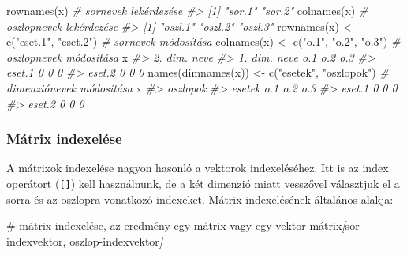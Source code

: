 \documentclass[
]{book}
\newenvironment{Shaded}{\begin{snugshade}}{\end{snugshade}}
\newcommand{\CommentTok}[1]{\textcolor[rgb]{0.56,0.35,0.01}{\textit{#1}}}
\newcommand{\FunctionTok}[1]{\textcolor[rgb]{0.00,0.00,0.00}{#1}}
\newcommand{\NormalTok}[1]{#1}
\newcommand{\OtherTok}[1]{\textcolor[rgb]{0.56,0.35,0.01}{#1}}
\newcommand{\StringTok}[1]{\textcolor[rgb]{0.31,0.60,0.02}{#1}}
\begin{document}
\begin{Shaded}
\begin{Highlighting}[]
\FunctionTok{rownames}\NormalTok{(x)                           }\CommentTok{\# sornevek lekérdezése}
\CommentTok{\#\textgreater{} [1] "sor.1" "sor.2"}
\FunctionTok{colnames}\NormalTok{(x)                           }\CommentTok{\# oszlopnevek lekérdezése}
\CommentTok{\#\textgreater{} [1] "oszl.1" "oszl.2" "oszl.3"}
\FunctionTok{rownames}\NormalTok{(x) }\OtherTok{\textless{}{-}} \FunctionTok{c}\NormalTok{(}\StringTok{"eset.1"}\NormalTok{, }\StringTok{"eset.2"}\NormalTok{)  }\CommentTok{\# sornevek módosítása}
\FunctionTok{colnames}\NormalTok{(x) }\OtherTok{\textless{}{-}} \FunctionTok{c}\NormalTok{(}\StringTok{"o.1"}\NormalTok{, }\StringTok{"o.2"}\NormalTok{, }\StringTok{"o.3"}\NormalTok{) }\CommentTok{\# oszlopnevek módosítása}
\NormalTok{x}
\CommentTok{\#\textgreater{}             2. dim. neve}
\CommentTok{\#\textgreater{} 1. dim. neve o.1 o.2 o.3}
\CommentTok{\#\textgreater{}       eset.1   0   0   0}
\CommentTok{\#\textgreater{}       eset.2   0   0   0}
\FunctionTok{names}\NormalTok{(}\FunctionTok{dimnames}\NormalTok{(x)) }\OtherTok{\textless{}{-}} \FunctionTok{c}\NormalTok{(}\StringTok{"esetek"}\NormalTok{, }\StringTok{"oszlopok"}\NormalTok{) }\CommentTok{\# dimenziónevek módosítása}
\NormalTok{x}
\CommentTok{\#\textgreater{}         oszlopok}
\CommentTok{\#\textgreater{} esetek   o.1 o.2 o.3}
\CommentTok{\#\textgreater{}   eset.1   0   0   0}
\CommentTok{\#\textgreater{}   eset.2   0   0   0}
\end{Highlighting}
\end{Shaded}

\hypertarget{muxe1trix-indexeluxe9se}{%
\subsubsection{Mátrix indexelése}\label{muxe1trix-indexeluxe9se}}

A mátrixok indexelése nagyon hasonló a vektorok indexeléséhez. Itt is az index operátort (\texttt{{[}{]}}) kell használnunk, de a két dimenzió miatt vesszővel választjuk el a sorra és az oszlopra vonatkozó indexeket. Mátrix indexelésének általános alakja:

\begin{Shaded}
\begin{Highlighting}[]
\FunctionTok{\# mátrix indexelése, az eredmény egy mátrix vagy egy vektor}
\NormalTok{mátrix}\CommentTok{[}\OtherTok{sor{-}indexvektor, oszlop{-}indexvektor}\CommentTok{]}
\end{Highlighting}
\end{Shaded}
\end{document}
